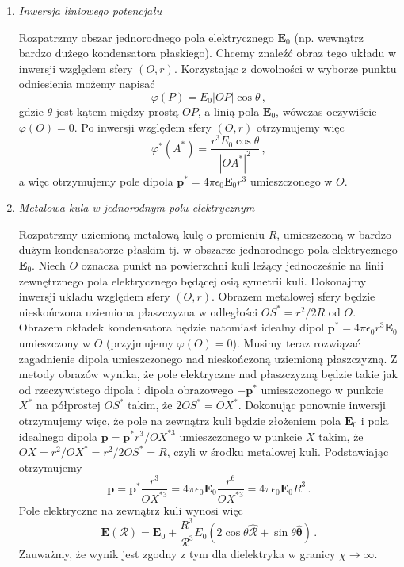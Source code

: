 \documentclass[../main.tex]{subfiles}
\begin{document}
\begin{enumerate}
    \item \textit{Inwersja liniowego potencjału}
    \medskip
    
    Rozpatrzmy obszar jednorodnego pola elektrycznego \(\mathbf{E}_0\) (np. wewnątrz bardzo dużego
    kondensatora płaskiego). Chcemy znaleźć obraz tego układu w inwersji względem sfery \((O,r)\).
    Korzystając z dowolności w wyborze punktu odniesienia możemy napisać
    \begin{equation*}
        \varphi(P)=E_0|OP|\cos\theta\,,
    \end{equation*}
    gdzie \(\theta\) jest kątem między prostą \(OP\), a linią pola \(\mathbf{E}_0\), wówczas
    oczywiście \(\varphi(O)=0\). Po inwersji względem sfery \((O,r)\) otrzymujemy więc
    \begin{equation*}
        \varphi^*(A^*)=\frac{r^3E_0\cos\theta}{|OA^{*}|^2}\,,
    \end{equation*}
    a więc otrzymujemy pole dipola \(\mathbf{p}^*=4\pi\epsilon_0\mathbf{E}_0r^3\) umieszczonego w
    \(O\).
    \item \textit{Metalowa kula w jednorodnym polu elektrycznym}
    \medskip
    
    Rozpatrzmy uziemioną metalową kulę o promieniu \(R\), umieszczoną w bardzo dużym kondensatorze
    płaskim tj. w obszarze jednorodnego pola elektrycznego \(\mathbf{E}_0\). Niech \(O\) oznacza
    punkt na powierzchni kuli leżący jednocześnie na linii zewnętrznego pola elektrycznego będącej
    osią symetrii kuli. Dokonajmy inwersji układu względem sfery \((O,r)\). Obrazem metalowej sfery
    będzie nieskończona uziemiona płaszczyzna w odległości \(OS^*=r^2/2R\) od \(O\). Obrazem okładek
    kondensatora będzie natomiast idealny dipol \(\mathbf{p}^*=4\pi\epsilon_0r^3\mathbf{E}_0\)
    umieszczony w \(O\) (przyjmujemy \(\varphi(O)=0\)). Musimy teraz rozwiązać zagadnienie dipola
    umieszczonego nad nieskończoną uziemioną płaszczyzną. Z metody obrazów wynika, że pole
    elektryczne nad płaszczyzną będzie takie jak od rzeczywistego dipola i dipola obrazowego
    \(-\mathbf{p}^*\) umieszczonego w punkcie \(X^*\) na półprostej \(OS^*\) takim, że
    \(2OS^*=OX^*\). Dokonując ponownie inwersji otrzymujemy więc, że pole na zewnątrz kuli będzie
    złożeniem pola \(\mathbf{E}_0\) i pola idealnego dipola \(\mathbf{p}=\mathbf{p}^*r^3/OX^{*3}\)
    umieszczonego w punkcie \(X\) takim, że \(OX=r^2/OX^*=r^2/2OS^*=R\), czyli w środku metalowej
    kuli. Podstawiając otrzymujemy
    \begin{equation*}
        \mathbf{p}=\mathbf{p}^*\frac{r^3}{OX^{*3}}=4\pi\epsilon_0\mathbf{E}_0\frac{r^6}{OX^{*3}}=4\pi\epsilon_0\mathbf{E}_0R^3\,.
    \end{equation*}
    Pole elektryczne na zewnątrz kuli wynosi więc
    \begin{equation*}
        \mathbf{E}(\boldsymbol{\mathcal{R}})=\mathbf{E}_0+\frac{R^3}{\mathcal{R}^3}E_0(2\cos\theta\boldsymbol{\hat{\mathcal{R}}}+\sin\theta\boldsymbol{\hat{\theta}})\,.
    \end{equation*}
    Zauważmy, że wynik jest zgodny z tym dla dielektryka w granicy \(\chi\to\infty\).
    

\end{enumerate}
\end{document}
